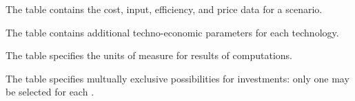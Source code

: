 \documentclass[letterpaper,10pt,english]{sphinxmanual}
\begin{document}
The  table contains the cost, input, efficiency, and price data for a scenario.

\begin{sphinxVerbatim}[commandchars=\\\{\}]
      
\end{sphinxVerbatim}



The  table contains additional techno-economic parameters for each technology.

\begin{sphinxVerbatim}[commandchars=\\\{\}]
         
\end{sphinxVerbatim}



The  table specifies the units of measure for results of computations.

\begin{sphinxVerbatim}[commandchars=\\\{\}]
\end{sphinxVerbatim}



The  table specifies multually exclusive possibilities for investments: only one  may be selected for each .

\begin{sphinxVerbatim}[commandchars=\\\{\}]
\end{sphinxVerbatim}
\end{document}

